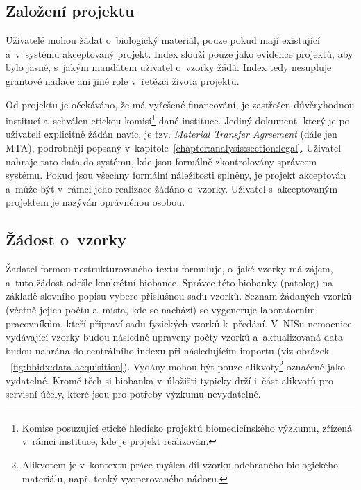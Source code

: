 \documentclass[11pt, final, oneside]{fithesis2}
\begin{document}
\subsection{Založení projektu}
Uživatelé mohou žádat o~biologický materiál, pouze pokud mají existující a~v~systému akceptovaný projekt. Index slouží pouze jako evidence projektů, aby bylo jasné, s~jakým mandátem uživatel o~vzorky žádá. Index tedy nesupluje grantové nadace ani jiné role v~řetězci života projektu. 

Od projektu je očekáváno, že má vyřešené financování, je zastřešen důvěryhodnou institucí a~schválen etickou komisí\footnote{Komise posuzující etické hledisko projektů biomedicínského výzkumu, zřízená v~rámci instituce, kde je projekt realizován.} dané instituce. Jediný dokument, který je po uživateli explicitně žádán navíc, je tzv. \textit{Material Transfer Agreement} (dále jen MTA), podrobněji popsaný v~kapitole~\ref{chapter:analysis:section:legal}. Uživatel nahraje tato data do systému, kde jsou formálně zkontrolovány správcem systému. Pokud jsou všechny formální náležitosti splněny, je projekt akceptován a~může být v~rámci jeho realizace žádáno o~vzorky.
Uživatel s~akceptovaným projektem je nazýván oprávněnou osobou. 

\subsection{Žádost o~vzorky}

Žadatel formou nestrukturovaného textu formuluje, o~jaké vzorky má zájem, a~tuto žádost odešle konkrétní biobance. Správce této biobanky (patolog) na základě slovního popisu vybere příslušnou sadu vzorků. Seznam žádaných vzorků (včetně jejich počtu a~místa, kde se nachází) se vygeneruje laboratorním pracovníkům, kteří připraví sadu fyzických vzorků k~předání. V~NISu nemocnice vydávající vzorky budou následně upraveny počty vzorků a~aktualizovaná data budou nahrána do centrálního indexu při následujícím importu (viz obrázek ~\ref{fig:bbidx:data-acquisition}). Vydány mohou být pouze alikvoty\footnote{Alikvotem je v~kontextu práce myšlen díl vzorku odebraného biologického materiálu, např. tenký  vyoperovaného nádoru.} označené jako vydatelné. Kromě těch si biobanka v~úložišti typicky drží i~část alikvotů pro servisní účely, které jsou pro potřeby výzkumu nevydatelné.
\end{document}
